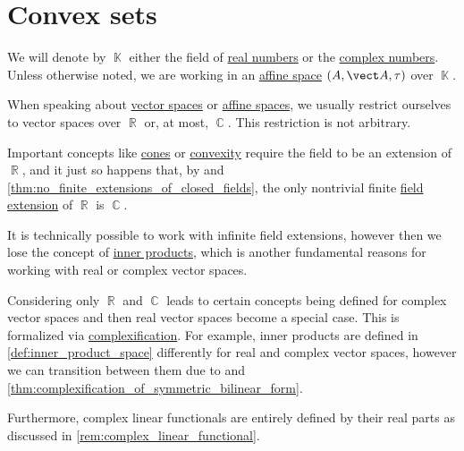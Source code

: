\section{Convex sets}\label{sec:convex_sets}

We will denote by \( \BbbK \) either the field of \hyperref[def:real_numbers]{real numbers} or the \hyperref[def:real_numbers]{complex numbers}. Unless otherwise noted, we are working in an \hyperref[def:affine_space]{affine space} \( (A, \vect A, \tau) \) over \( \BbbK \).

\begin{remark}\label{rem:real_field_extensions}
  When speaking about \hyperref[def:vector_space]{vector spaces} or \hyperref[def:affine_space]{affine spaces}, we usually restrict ourselves to vector spaces over \( \BbbR \) or, at most, \( \BbbC \). This restriction is not arbitrary.

  Important concepts like \hyperref[def:geometric_cone]{cones} or \hyperref[def:convex_hull]{convexity} require the field to be an extension of \( \BbbR \), and it just so happens that, by  and \cref{thm:no_finite_extensions_of_closed_fields}, the only nontrivial finite \hyperref[def:field/subobject]{field extension} of \( \BbbR \) is \( \BbbC \).

  It is technically possible to work with infinite field extensions, however then we lose the concept of \hyperref[def:inner_product_space]{inner products}, which is another fundamental reasons for working with real or complex vector spaces.

  Considering only \( \BbbR \) and \( \BbbC \) leads to certain concepts being defined for complex vector spaces and then real vector spaces become a special case. This is formalized via \hyperref[def:complexification]{complexification}. For example, inner products are defined in \cref{def:inner_product_space} differently for real and complex vector spaces, however we can transition between them due to  and \cref{thm:complexification_of_symmetric_bilinear_form}.

  Furthermore, complex linear functionals are entirely defined by their real parts as discussed in \cref{rem:complex_linear_functional}.
\end{remark}

